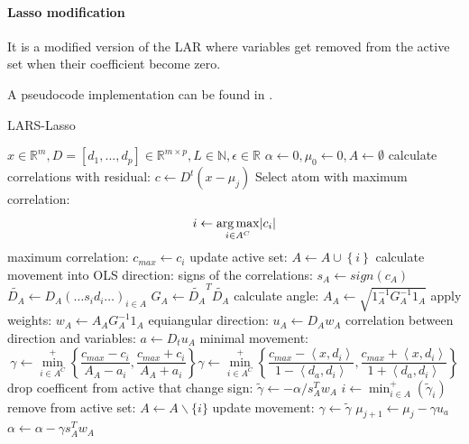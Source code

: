 \paragraph{Lasso modification}
It is a modified version of the LAR where variables get removed from the active
set when their coefficient become zero.

A pseudocode implementation can be found in .
\begin{algorithm}
\caption{LARS-Lasso}
\label{alg:lars}
\begin{algorithmic}[1]
\REQUIRE $x \in \mathbb{R}^m, D =[d_1,...,d_p] \in \mathbb{R}^{m\times p}, L \in
\mathbb{N}, \epsilon \in \mathbb{R}$
\STATE $\alpha \gets 0, \mu_{0} \gets 0, A \gets \emptyset$
\STATE calculate correlations with residual: $c \gets D^t\left( x-\mu_j \right)
$
\STATE Select atom with maximum correlation: 
\begin{equation*}
i \gets \argmax_{i \in A^C} \lvert c_i  \rvert %
\end{equation*}
\STATE maximum correlation: $c_{max} \gets c_i $ %
\STATE update active set: $A \gets A \cup \left\{i\right\} $
\STATE calculate movement into OLS direction:
\STATE signs of the correlations: $s_A \gets  sign\left(c_A\right)$
\STATE $\tilde{D_A} \gets D_A\left(\ldots s_id_i \ldots\right)_{i\in A}$
\STATE $G_A \gets \tilde{D_A}^T\tilde{D_A}$
\STATE calculate angle: $A_A \gets \sqrt{ 1_A^{-1} G_A^{-1} 1_A
}$
\STATE apply weights: $w_A \gets A_AG_A^{-1}1_A$
\STATE equiangular direction: $u_A \gets D_Aw_A$
\STATE correlation between direction and variables: $a \gets D_tu_A$
\STATE minimal movement:
\begin{equation*}
\gamma \gets \min_{i\in A^C}^{+} \left\lbrace \frac{c_{max}-c_i }{A_A-a_i },
\frac{c_{max}+c_i }{A_A+a_i } \right\rbrace
\gamma \gets \min_{i\in A^C}^{+} \left\lbrace \frac{c_{max}-\left< x,d_i
\right> }{1-\left< d_a,d_i \right> }, \frac{c_{max}+\left< x,d_i \right>
}{1+\left< d_a,d_i \right> } \right\rbrace
\end{equation*}
\STATE drop coefficent from active that change sign: 
\STATE $ \tilde{\gamma} \gets -\alpha/s_A^Tw_A  $
\STATE $ i \gets \min_{i\in A}^{+} \left( \tilde{\gamma}_i \right) $
\STATE remove from active set: $ A \gets A \backslash \{i\} $
\STATE update movement: $ \gamma \gets \tilde{\gamma} $  
\ENDIF
\STATE $ \mu_{j+1} \gets \mu_{j} - \gamma u_a $
\STATE $ \alpha \gets \alpha - \gamma s_A^Tw_A $
\ENDFOR
\end{algorithmic}
\end{algorithm}


